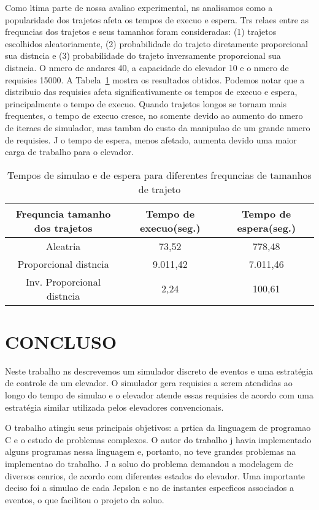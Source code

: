 \documentclass[12pt]{article}
\begin{document}
Como ltima parte de nossa avaliao experimental, ns analisamos como a popularidade dos trajetos afeta os tempos de execuo e espera. Trs relaes entre as frequncias dos trajetos e seus tamanhos foram consideradas: (1) trajetos escolhidos aleatoriamente, (2) probabilidade do trajeto diretamente proporcional  sua distncia e (3) probabilidade do trajeto inversamente proporcional  sua distncia. O nmero de andares  40, a capacidade do elevador  10 e o nmero de requisies  15000. A Tabela~\ref{tempos_freq_trajetos} mostra os resultados obtidos. Podemos notar que a distribuio das requisies afeta significativamente os tempos de execuo e espera, principalmente o tempo de execuo. Quando trajetos longos se tornam mais frequentes, o tempo de execuo cresce, no somente devido ao aumento do nmero de iteraes de simulador, mas tambm do custo da manipulao de um grande nmero de requisies. J o tempo de espera, menos afetado, aumenta devido  uma maior carga de trabalho para o elevador.

\begin{table}[ht!]
\centering
\begin{footnotesize}
\begin{tabular}{|c|c|c|}
\hline
\textbf{Frequncia tamanho dos trajetos}              & \textbf{Tempo de execuo(seg.)}      & \textbf{Tempo de espera(seg.)} \\ \hline
Aleatria			& 73,52	& 778,48	\\ \hline
Proporcional  distncia	& 9.011,42	& 7.011,46	\\ \hline
Inv. Proporcional  distncia	& 2,24	& 100,61	\\ \hline
\end{tabular}
\end{footnotesize}
\caption{Tempos de simulao e de espera para diferentes frequncias de tamanhos de trajeto \label{tempos_freq_trajetos}}
\end{table}

\section{CONCLUSO}
\label{conclusao}

Neste trabalho ns descrevemos um simulador discreto de eventos e uma estratégia de controle de um elevador. O simulador gera requisies a serem atendidas ao longo do tempo de simulao e o elevador atende  essas requisies de acordo com uma estratégia similar  utilizada pelos elevadores convencionais.

O trabalho atingiu seus principais objetivos: a prtica da linguagem de programao C e o estudo de problemas complexos. O autor do trabalho j havia implementado alguns programas nessa linguagem e, portanto, no teve grandes problemas na implementao do trabalho. J a soluo do problema demandou a modelagem de diversos cenrios, de acordo com diferentes estados do elevador. Uma importante deciso foi a simulao de cada Jepslon e no de instantes especficos associados a eventos, o que facilitou o projeto da soluo.
\end{document}
